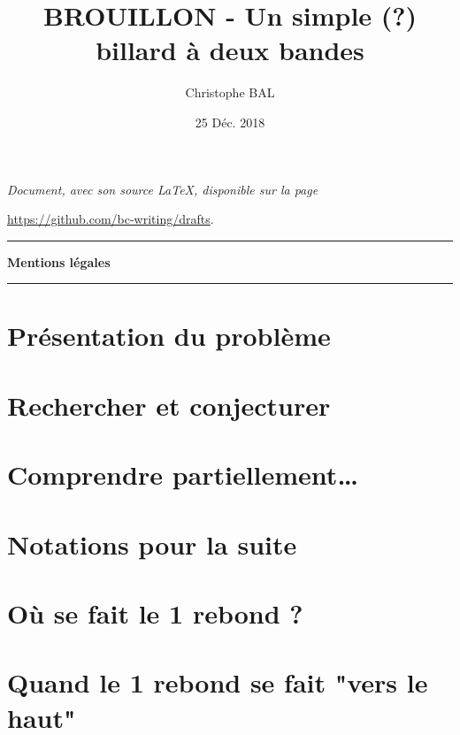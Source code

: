 \documentclass[12pt]{amsart}
\begin{document}
\title{BROUILLON - Un simple (\!?) billard à deux bandes}
\author{Christophe BAL}
\date{25 Déc. 2018}

\maketitle

\begin{center}
	\itshape
	Document, avec son source \LaTeX, disponible sur la page
	
	\url{https://github.com/bc-writing/drafts}.
\end{center}


\bigskip


\begin{center}
	\hrule\vspace{.3em}
	{
		\fontsize{1.35em}{1em}\selectfont
		\textbf{Mentions \og légales \fg}
	}
			
	\vspace{0.45em}
	\doclicenseThis
	\hrule
\end{center}

	
\setcounter{tocdepth}{2}
\tableofcontents



\section{Présentation du problème}




\section{Rechercher et conjecturer}




\section{Comprendre partiellement\dots}




\section{Notations pour la suite}




\section{Où se fait le 1\ier{} rebond ?}
\label{1st-bounce}




\section{Quand le 1\ier{} rebond se fait "vers le haut"}


\end{document}
